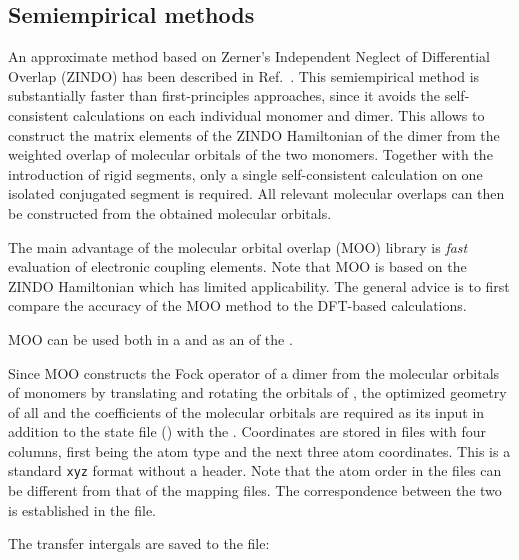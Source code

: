 \subsection{Semiempirical methods}
\label{sec:moo}

\newcommand{\moo}{MOO\xspace}

An approximate method based on Zerner's Independent Neglect of Differential Overlap (ZINDO) has been described in Ref.~\cite{kirkpatrick_approximate_2008}. This semiempirical method is substantially faster than first-principles approaches, since it avoids the self-consistent calculations on each individual monomer and dimer. This allows to construct the matrix elements of the ZINDO Hamiltonian of the dimer from the weighted overlap of molecular orbitals of the two monomers. Together with the introduction of rigid segments, only a single self-consistent calculation on one isolated conjugated segment is required. All relevant molecular overlaps can then be constructed from the obtained molecular orbitals.

The main advantage of the molecular orbital overlap (\moo) library is {\em fast} evaluation of electronic coupling elements. Note that \moo is based on the ZINDO Hamiltonian which has limited applicability. The general advice is to first compare the accuracy of the \moo method to the DFT-based calculations. 

\moo can be used both in a  and as an \integrals \calculator of the \votcactp. 

Since \moo constructs the Fock operator of a dimer from the  molecular orbitals of monomers by translating and rotating the orbitals of , the optimized geometry of all  and the coefficients of the molecular orbitals are required as its input in addition to the state file (\sqlstate) with the . Coordinates are stored in \xyz files with four columns, first being the atom type and the next three atom coordinates. This is a standard \texttt{xyz} format without a header. Note that the atom order in the \xyz files can be different from that of the mapping files. The correspondence between the two is established in the \xmlsegments file.

The transfer intergals are saved to the \sqlstate file:

{\noindent \small \ctprun \opt \xmloptions  \seg  \xmlsegments \sql  \sqlstate \exe  {} }
